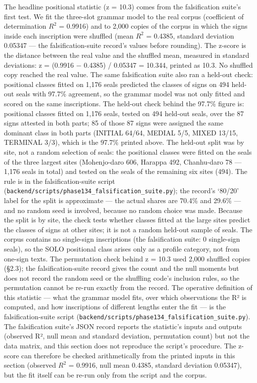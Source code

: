 \documentclass[11pt]{article}
\begin{document}
The headline positional statistic (z = 10.3) comes from the falsification suite's first test. We fit the three-slot grammar model to the real corpus (coefficient of determination $R^2$ = 0.9916) and to 2,000 copies of the corpus in which the signs inside each inscription were shuffled (mean $R^2$ = 0.4385, standard deviation 0.05347 --- the falsification-suite record's values before rounding). The z-score is the distance between the real value and the shuffled mean, measured in standard deviations: z = (0.9916 $-$ 0.4385) / 0.05347 = 10.344, printed as 10.3. No shuffled copy reached the real value. The same falsification suite also ran a held-out check: positional classes fitted on 1,176 seals predicted the classes of signs on 494 held-out seals with 97.7\% agreement, so the grammar model was not only fitted and scored on the same inscriptions. The held-out check behind the 97.7\% figure is: positional classes fitted on 1,176 seals, tested on 494 held-out seals, over the 87 signs attested in both parts; 85 of those 87 signs were assigned the same dominant class in both parts (INITIAL 64/64, MEDIAL 5/5, MIXED 13/15, TERMINAL 3/3), which is the 97.7\% printed above. The held-out split was by site, not a random selection of seals: the positional classes were fitted on the seals of the three largest sites (Mohenjo-daro 606, Harappa 492, Chanhu-daro 78 --- 1,176 seals in total) and tested on the seals of the remaining six sites (494). The rule is in the falsification-suite script (\texttt{backend/scripts/phase134\_falsification\_suite.py}); the record's `80/20' label for the split is approximate --- the actual shares are 70.4\% and 29.6\% --- and no random seed is involved, because no random choice was made. Because the split is by site, the check tests whether classes fitted at the large sites predict the classes of signs at other sites; it is not a random held-out sample of seals. The corpus contains no single-sign inscriptions (the falsification suite: 0 single-sign seals), so the SOLO positional class arises only as a profile category, not from one-sign texts. The permutation check behind z = 10.3 used 2,000 shuffled copies (§2.3); the falsification-suite record gives the count and the null moments but does not record the random seed or the shuffling code's inclusion rules, so the permutation cannot be re-run exactly from the record. The operative definition of this statistic --- what the grammar model fits, over which observations the R² is computed, and how inscriptions of different lengths enter the fit --- is the falsification-suite script (\texttt{backend/scripts/phase134\_falsification\_suite.py}). The falsification suite's JSON record reports the statistic's inputs and outputs (observed R², null mean and standard deviation, permutation count) but not the data matrix, and this section does not reproduce the script's procedure. The z-score can therefore be checked arithmetically from the printed inputs in this section (observed $R^2$ = 0.9916, null mean 0.4385, standard deviation 0.05347), but the fit itself can be re-run only from the script and the corpus.
\end{document}

